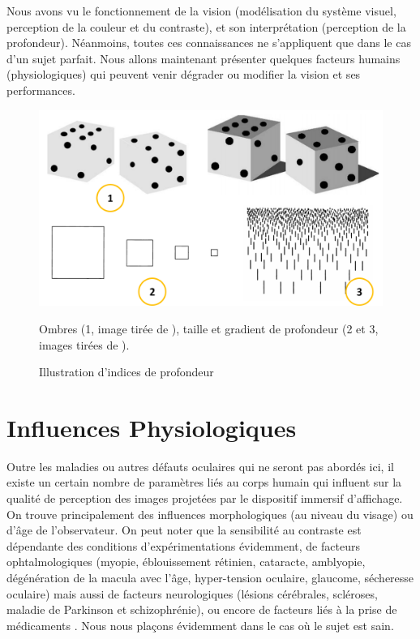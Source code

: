 	\par Nous avons vu le fonctionnement de la vision (modélisation du système visuel, perception de la couleur et du contraste), et son interprétation (perception de la profondeur). Néanmoins, toutes ces connaissances ne s'appliquent que dans le cas d'un sujet parfait. Nous allons maintenant présenter quelques facteurs humains (physiologiques) qui peuvent venir dégrader ou modifier la vision et ses performances.	
	
	\begin{figure}[h]
		\centering
		\includegraphics[scale=.25]{Figures/PerspectivesProfondeur}
		\caption{Illustration d'indices de profondeur}{Ombres (1, image tirée de \citep{anses_effets_2014}), taille et gradient de profondeur (2 et 3, images tirées de \citep{glassner_principles_1995}).}
		\label{fig:profondeur_perspectives}
	\end{figure}
	
\chapter{Influences Physiologiques}
	\par Outre les maladies ou autres défauts oculaires qui ne seront pas abordés ici, il existe un certain nombre de paramètres liés au corps humain qui influent sur la qualité de perception des images projetées par le dispositif immersif d'affichage. On trouve principalement des influences morphologiques (au niveau du visage) ou d'âge de l'observateur. On peut noter que la sensibilité au contraste est dépendante des conditions d'expérimentations évidemment, de facteurs ophtalmologiques (myopie, éblouissement rétinien, cataracte, amblyopie, dégénération de la macula avec l'âge, hyper-tension oculaire, glaucome, sécheresse oculaire) mais aussi de facteurs neurologiques (lésions cérébrales, scléroses, maladie de Parkinson et schizophrénie), ou encore de facteurs liés à la prise de médicaments \citep{pelli_measuring_2013}. Nous nous plaçons évidemment dans le cas où le sujet est sain.
		
